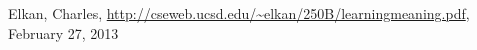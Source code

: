 \begin{thebibliography}{8}

 Elkan, Charles, \url{http://cseweb.ucsd.edu/~elkan/250B/learningmeaning.pdf}, February 27, 2013
	
\end{thebibliography}